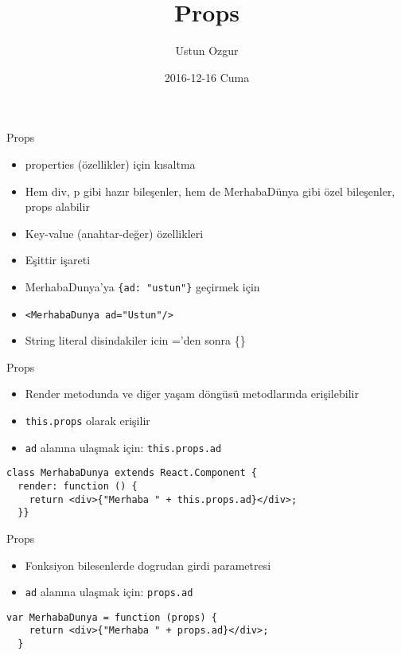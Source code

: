 \documentclass[presentation]{beamer}
\author{Ustun Ozgur}
\date{2016-12-16 Cuma}
\title{Props}
\begin{document}
\maketitle

\begin{frame}[fragile,label={sec:org51d58a0}]{Props}
 \begin{itemize}
\item properties (özellikler) için kısaltma
\item Hem div, p gibi hazır bileşenler, hem de MerhabaDünya gibi özel bileşenler,
props alabilir
\item Key-value (anahtar-değer) özellikleri
\item Eşittir işareti
\item MerhabaDunya'ya \texttt{\{ad: "ustun"\}} geçirmek için
\item \texttt{<MerhabaDunya ad="Ustun"/>}
\item String literal disindakiler icin ='den sonra \{\}
\end{itemize}
\end{frame}

\begin{frame}[fragile,label={sec:org59cd9c1}]{Props}
 \begin{itemize}
\item Render metodunda ve diğer yaşam döngüsü metodlarında erişilebilir
\item \texttt{this.props} olarak erişilir
\item \texttt{ad} alanına ulaşmak için: \texttt{this.props.ad}
\end{itemize}
\begin{verbatim}
class MerhabaDunya extends React.Component {
  render: function () {
    return <div>{"Merhaba " + this.props.ad}</div>;
  }}
\end{verbatim}
\end{frame}

\begin{frame}[fragile,label={sec:orgeb14f93}]{Props}
 \begin{itemize}
\item Fonksiyon bilesenlerde dogrudan girdi parametresi
\item \texttt{ad} alanına ulaşmak için: \texttt{props.ad}
\end{itemize}
\begin{verbatim}
var MerhabaDunya = function (props) {
    return <div>{"Merhaba " + props.ad}</div>;
  }
\end{verbatim}
\end{frame}
\end{document}
